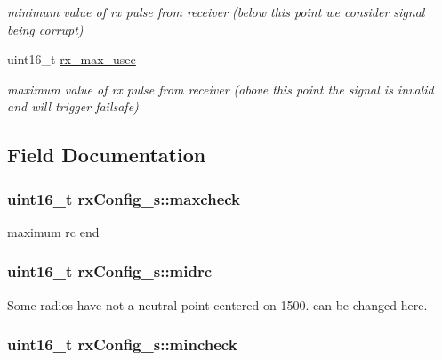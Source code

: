 \begin{DoxyCompactItemize}
\begin{DoxyCompactList}\small\item\em minimum value of rx pulse from receiver (below this point we consider signal being corrupt) \end{DoxyCompactList}\item 
uint16\+\_\+t \hyperlink{structrxConfig__s_a37f0f7740a4dbd2a7e5599b54811e36b}{rx\+\_\+max\+\_\+usec}
\begin{DoxyCompactList}\small\item\em maximum value of rx pulse from receiver (above this point the signal is invalid and will trigger failsafe) \end{DoxyCompactList}\end{DoxyCompactItemize}


\subsection{Field Documentation}
\hypertarget{structrxConfig__s_a46814cbc934d5b8d5270eeee26b586f2}{
\subsubsection[{maxcheck}]{\setlength{\rightskip}{0pt plus 5cm}uint16\+\_\+t rx\+Config\+\_\+s\+::maxcheck}}\label{structrxConfig__s_a46814cbc934d5b8d5270eeee26b586f2}


maximum rc end 

\hypertarget{structrxConfig__s_a413e18afb030caffe6cead58c8736145}{
\subsubsection[{midrc}]{\setlength{\rightskip}{0pt plus 5cm}uint16\+\_\+t rx\+Config\+\_\+s\+::midrc}}\label{structrxConfig__s_a413e18afb030caffe6cead58c8736145}


Some radios have not a neutral point centered on 1500. can be changed here. 

\hypertarget{structrxConfig__s_a51f9850bb1f8dfcd25244b993474af0a}{
\subsubsection[{mincheck}]{\setlength{\rightskip}{0pt plus 5cm}uint16\+\_\+t rx\+Config\+\_\+s\+::mincheck}}\label{structrxConfig__s_a51f9850bb1f8dfcd25244b993474af0a}


